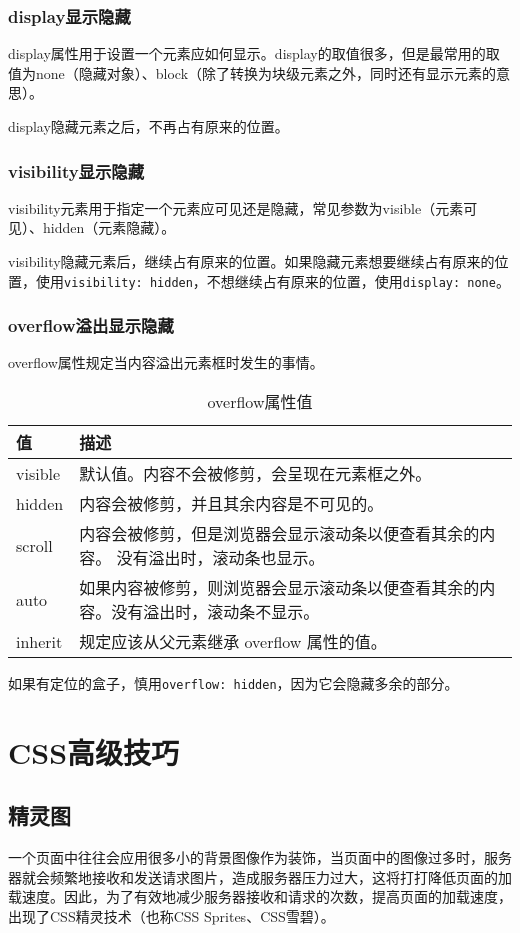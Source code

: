 \subsection{display显示隐藏}
display属性用于设置一个元素应如何显示。display的取值很多，但是最常用的取值为none（隐藏对象）、block（除了转换为块级元素之外，同时还有显示元素的意思）。

display隐藏元素之后，不再占有原来的位置。
\subsection{visibility显示隐藏}
visibility元素用于指定一个元素应可见还是隐藏，常见参数为visible（元素可见）、hidden（元素隐藏）。

visibility隐藏元素后，继续占有原来的位置。如果隐藏元素想要继续占有原来的位置，使用\verb|visibility: hidden|，不想继续占有原来的位置，使用\verb|display: none|。
\subsection{overflow溢出显示隐藏}
overflow属性规定当内容溢出元素框时发生的事情。
\begin{table}[H]
    \caption{overflow属性值}
    \centering\begin{tabular}{ll}

        \hline
        值       & 描述                                         \\
        \hline
        visible & 默认值。内容不会被修剪，会呈现在元素框之外。                     \\
        hidden  & 内容会被修剪，并且其余内容是不可见的。                        \\
        scroll  & 内容会被修剪，但是浏览器会显示滚动条以便查看其余的内容。 没有溢出时，滚动条也显示。 \\
        auto    & 如果内容被修剪，则浏览器会显示滚动条以便查看其余的内容。没有溢出时，滚动条不显示。  \\
        inherit & 规定应该从父元素继承 overflow 属性的值。                  \\
        \hline
    \end{tabular}
\end{table}

如果有定位的盒子，慎用\verb|overflow: hidden|，因为它会隐藏多余的部分。
\chapter{CSS高级技巧}
\section{精灵图}
一个页面中往往会应用很多小的背景图像作为装饰，当页面中的图像过多时，服务器就会频繁地接收和发送请求图片，造成服务器压力过大，这将打打降低页面的加载速度。因此，为了有效地减少服务器接收和请求的次数，提高页面的加载速度，出现了CSS精灵技术（也称CSS Sprites、CSS雪碧）。

